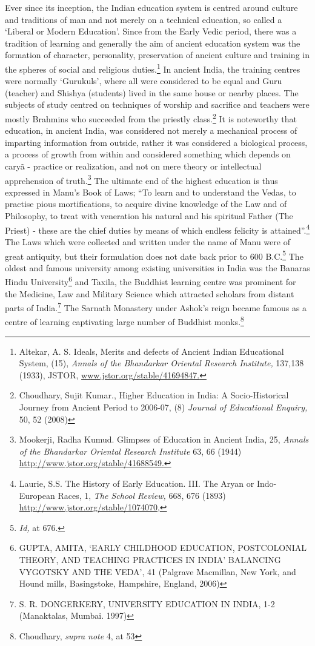 \begin{multicols}{2}

\noi
Ever since its inception, the Indian education system is centred around culture and traditions
of man and not merely on a technical education, so called a ‘Liberal or Modern Education’.
Since from the Early Vedic period, there was a tradition of learning and generally the aim of 
ancient education system was the formation of character, personality, preservation of ancient
culture and training in the spheres of social and religious duties.\footnote{Altekar, A. S. Ideals, Merits and defects of Ancient Indian Educational System, (15), \textit{Annals of the Bhandarkar Oriental Research Institute,} 137,138 (1933), JSTOR, \url{www.jstor.org/stable/41694847.}} In ancient India, the training
centres were normally ‘Gurukuls’, where all were considered to be equal and Guru (teacher)
and Shishya (students) lived in the same house or nearby places. The subjects of study
centred on techniques of worship and sacrifice and teachers were mostly Brahmins who
succeeded from the priestly class.\footnote{Choudhary, Sujit Kumar., Higher Education in India: A Socio-Historical Journey from Ancient Period to 2006-07, (8) \textit{Journal of Educational Enquiry,} 50, 52 (2008)} It is noteworthy that education, in ancient India, was considered not merely a mechanical process of imparting information from outside, rather it was considered a biological process, a process of growth from within and considered
something which depends on caryã - practice or realization, and not on mere theory or
intellectual apprehension of truth.\footnote{Mookerji, Radha Kumud. Glimpses of Education in Ancient India, 25, \textit{Annals of the Bhandarkar Oriental Research Institute} 63, 66 (1944) \url{http://www.jstor.org/stable/41688549.}} The ultimate end of the highest education is thus
expressed in Manu's Book of Laws; “To learn and to understand the Vedas, to practise pious
mortifications, to acquire divine knowledge of the Law and of Philosophy, to treat with
veneration his natural and his spiritual Father (The Priest) - these are the chief duties by
means of which endless felicity is attained”.\footnote{Laurie, S.S. The History of Early Education. III. The Aryan or Indo-European Races, 1, \textit{The School Review,} 668, 676 (1893) \url{http://www.jstor.org/stable/1074070,}} The Laws which were collected and written under the name of Manu were of great antiquity, but their formulation does not date back
prior to 600 B.C.\footnote{\textit{Id,} at 676.} The oldest and famous university among existing universities in India was
the Banaras Hindu University\footnote{GUPTA, AMITA, ‘EARLY CHILDHOOD EDUCATION, POSTCOLONIAL THEORY, AND TEACHING PRACTICES IN INDIA’ BALANCING VYGOTSKY AND THE VEDA’, 41 (Palgrave Macmillan, New York, and Hound mills, Basingstoke, Hampshire, England, 2006)} and Taxila, the Buddhist learning centre was prominent for the
Medicine, Law and Military Science which attracted scholars from distant parts of India.\footnote{S. R. DONGERKERY, UNIVERSITY EDUCATION IN INDIA, 1-2 (Manaktalas, Mumbai. 1997)}
The Sarnath Monastery under Ashok’s reign became famous as a centre of learning
captivating large number of Buddhist monks.\footnote{Choudhary, \textit{supra note} 4, at 53}


\end{multicols}
